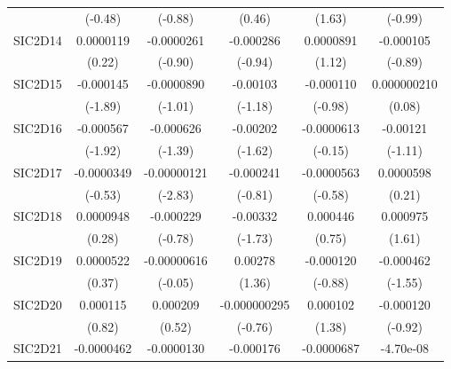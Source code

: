 \begin{table}[htbp]
\begin{tabular}{l*{5}{c}}
            &     (-0.48)         &     (-0.88)         &      (0.46)         &      (1.63)         &     (-0.99)         \\
SIC2D14     &   0.0000119         &  -0.0000261         &   -0.000286         &   0.0000891         &   -0.000105         \\
            &      (0.22)         &     (-0.90)         &     (-0.94)         &      (1.12)         &     (-0.89)         \\
SIC2D15     &   -0.000145         &  -0.0000890         &    -0.00103         &   -0.000110         & 0.000000210         \\
            &     (-1.89)         &     (-1.01)         &     (-1.18)         &     (-0.98)         &      (0.08)         \\
SIC2D16     &   -0.000567         &   -0.000626         &    -0.00202         &  -0.0000613         &    -0.00121         \\
            &     (-1.92)         &     (-1.39)         &     (-1.62)         &     (-0.15)         &     (-1.11)         \\
SIC2D17     &  -0.0000349         & -0.00000121\sym{**} &   -0.000241         &  -0.0000563         &   0.0000598         \\
            &     (-0.53)         &     (-2.83)         &     (-0.81)         &     (-0.58)         &      (0.21)         \\
SIC2D18     &   0.0000948         &   -0.000229         &    -0.00332         &    0.000446         &    0.000975         \\
            &      (0.28)         &     (-0.78)         &     (-1.73)         &      (0.75)         &      (1.61)         \\
SIC2D19     &   0.0000522         & -0.00000616         &     0.00278         &   -0.000120         &   -0.000462         \\
            &      (0.37)         &     (-0.05)         &      (1.36)         &     (-0.88)         &     (-1.55)         \\
SIC2D20     &    0.000115         &    0.000209         &-0.000000295         &    0.000102         &   -0.000120         \\
            &      (0.82)         &      (0.52)         &     (-0.76)         &      (1.38)         &     (-0.92)         \\
SIC2D21     &  -0.0000462         &  -0.0000130         &   -0.000176         &  -0.0000687         &   -4.70e-08         \\

\end{tabular}
\end{table}
